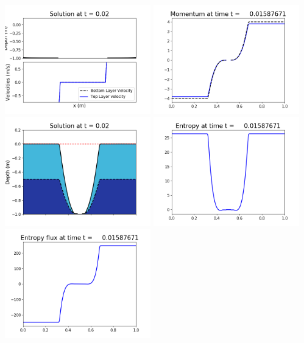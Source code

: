 \documentclass[11pt]{article}
\begin{document}
\includegraphics[width=0.475\textwidth]{frame0099fig1002.png}
\vskip 10pt 
\includegraphics[width=0.475\textwidth]{frame0099fig1003.png}
\includegraphics[width=0.475\textwidth]{frame0099fig1006.png}
\vskip 10pt 
\includegraphics[width=0.475\textwidth]{frame0099fig1007.png}
\includegraphics[width=0.475\textwidth]{frame0099fig1008.png}
\end{document}
